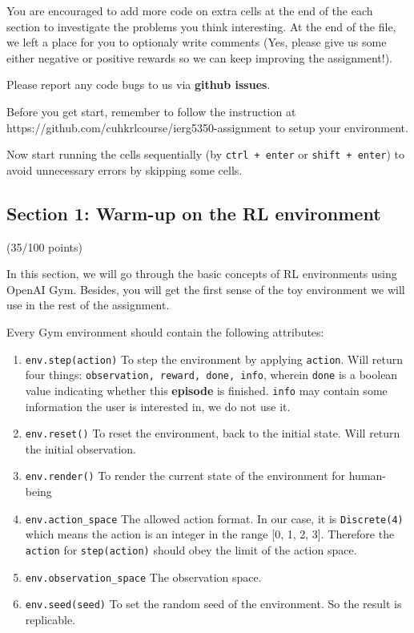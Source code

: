 \documentclass[11pt]{article}
\providecommand{\tightlist}{%
      \setlength{\itemsep}{0pt}\setlength{\parskip}{0pt}}
\begin{document}
You are encouraged to add more code on extra cells at the end of the
each section to investigate the problems you think interesting. At the
end of the file, we left a place for you to optionaly write comments
(Yes, please give us some either negative or positive rewards so we can
keep improving the assignment!).

Please report any code bugs to us via \textbf{github issues}.

Before you get start, remember to follow the instruction at
https://github.com/cuhkrlcourse/ierg5350-assignment to setup your
environment.

    Now start running the cells sequentially (by \texttt{ctrl\ +\ enter} or
\texttt{shift\ +\ enter}) to avoid unnecessary errors by skipping some
cells.

\subsection{Section 1: Warm-up on the RL
environment}\label{section-1-warm-up-on-the-rl-environment}

(35/100 points)

In this section, we will go through the basic concepts of RL
environments using OpenAI Gym. Besides, you will get the first sense of
the toy environment we will use in the rest of the assignment.

Every Gym environment should contain the following attributes:

\begin{enumerate}
\def\labelenumi{\arabic{enumi}.}
\tightlist
\item
  \texttt{env.step(action)} To step the environment by applying
  \texttt{action}. Will return four things:
  \texttt{observation,\ reward,\ done,\ info}, wherein \texttt{done} is
  a boolean value indicating whether this \textbf{episode} is finished.
  \texttt{info} may contain some information the user is interested in,
  we do not use it.
\item
  \texttt{env.reset()} To reset the environment, back to the initial
  state. Will return the initial observation.
\item
  \texttt{env.render()} To render the current state of the environment
  for human-being
\item
  \texttt{env.action\_space} The allowed action format. In our case, it
  is \texttt{Discrete(4)} which means the action is an integer in the
  range {[}0, 1, 2, 3{]}. Therefore the \texttt{action} for
  \texttt{step(action)} should obey the limit of the action space.
\item
  \texttt{env.observation\_space} The observation space.
\item
  \texttt{env.seed(seed)} To set the random seed of the environment. So
  the result is replicable.
\end{enumerate}
\end{document}
